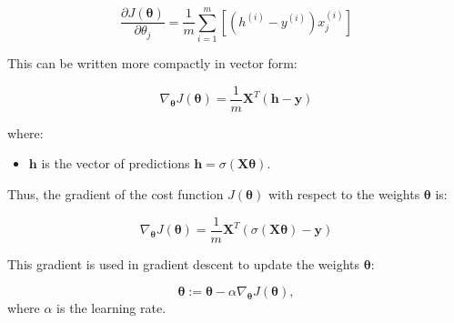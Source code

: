 \[
\frac{\partial J(\boldsymbol{\theta})}{\partial \theta_j} = \frac{1}{m} \sum_{i=1}^m \left[ (h^{(i)} - y^{(i)}) x_j^{(i)} \right]
\]

This can be written more compactly in vector form:

\[
\nabla_{\boldsymbol{\theta}} J(\boldsymbol{\theta}) = \frac{1}{m} \mathbf{X}^T (\mathbf{h} - \mathbf{y})
\]

where:
\begin{itemize}
    \item $\mathbf{h}$ is the vector of predictions $\mathbf{h} = \sigma(\mathbf{X} \boldsymbol{\theta})$.
\end{itemize}

Thus, the gradient of the cost function $J(\boldsymbol{\theta})$ with respect to the weights $\boldsymbol{\theta}$ is:

\[
\nabla_{\boldsymbol{\theta}} J(\boldsymbol{\theta}) = \frac{1}{m} \mathbf{X}^T (\sigma(\mathbf{X} \boldsymbol{\theta}) - \mathbf{y})
\]

This gradient is used in gradient descent to update the weights $\boldsymbol{\theta}$:

\[
\boldsymbol{\theta} := \boldsymbol{\theta} - \alpha \nabla_{\boldsymbol{\theta}} J(\boldsymbol{\theta}),
\]
where $\alpha$ is the learning rate.

